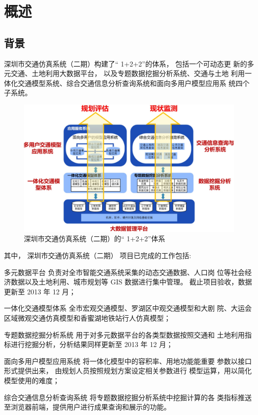 

\chapter{概述}

\section{背景} 
深圳市交通仿真系统（二期）构建了“ 1+2+2”的体系， 包括一个可动态更
新的多元交通、土地利用大数据平台， 以及专题数据挖掘分析系统、交通与土地
利用一体化交通模型系统、综合交通信息分析查询系统和面向多用户模型应用系
统四个子系统。

\begin{figure}[!hbt]
  \centering
  \includegraphics[width=\textwidth]{figures/项目体系架构.jpg}
  \caption{深圳市交通仿真系统（二期）的“ 1+2+2”体系\label{fig:项目体系架构}}
\end{figure}

其中， 深圳市交通仿真系统（二期） 项目已完成的工作包括:

\begin{para}
\item[多元数据平台] 负责对全市智能交通系统采集的动态交通数据、人口岗
位等社会经济数据以及土地利用、城市规划等 GIS 数据进行集中管理。
截止项目验收，数据更新至 2013 年 12 月；
\item[一体化交通模型体系] 全市宏观交通模型、罗湖区中观交通模型和大剧
院、大运会区域微观交通仿真模型和香蜜湖地铁站行人仿真模型；
\item[专题数据挖掘分析系统] 用于对多元数据平台的各类型数据按照交通和
土地利用指标进行挖掘分析，分析结果同样更新至 2013 年 12 月；
\item[面向多用户模型应用系统] 将一体化模型中的容积率、用地功能能重要
参数以接口形式提供出来， 由规划人员按照规划方案设定相关参数进行
模型运算，用以简化模型使用的难度；
\item[综合交通信息分析查询系统] 将专题数据挖掘分析系统中挖掘计算的各
类指标推送至浏览器前端，提供用户进行成果查询和展示的功能。
\end{para}


